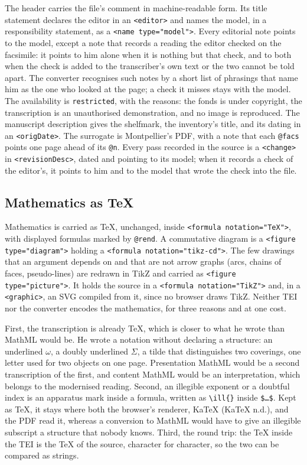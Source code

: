 \documentclass[11pt]{article}
\begin{document}
The header carries the file's comment in machine-readable form. Its title statement declares the editor in an \texttt{<editor>} and names the model, in a responsibility statement, as a \texttt{<name type="model">}. Every editorial note points to the model, except a note that records a reading the editor checked on the facsimile: it points to him alone when it is nothing but that check, and to both when the check is added to the transcriber's own text or the two cannot be told apart. The converter recognises such notes by a short list of phrasings that name him as the one who looked at the page; a check it misses stays with the model. The availability is \texttt{restricted}, with the reasons: the fonds is under copyright, the transcription is an unauthorised demonstration, and no image is reproduced. The manuscript description gives the shelfmark, the inventory's title, and its dating in an \texttt{<origDate>}. The surrogate is Montpellier's PDF, with a note that each \texttt{@facs} points one page ahead of its \texttt{@n}. Every pass recorded in the source is a \texttt{<change>} in \texttt{<revisionDesc>}, dated and pointing to its model; when it records a check of the editor's, it points to him and to the model that wrote the check into the file.

\subsection{Mathematics as TeX}

Mathematics is carried as TeX, unchanged, inside \texttt{<formula notation="TeX">}, with displayed formulas marked by \texttt{@rend}. A commutative diagram is a \texttt{<figure type="diagram">} holding a \texttt{<formula notation="tikz-cd">}. The few drawings that an argument depends on and that are not arrow graphs (arcs, chains of faces, pseudo-lines) are redrawn in TikZ and carried as \texttt{<figure type="picture">}. It holds the source in a \texttt{<formula notation="TikZ">} and, in a \texttt{<graphic>}, an SVG compiled from it, since no browser draws TikZ. Neither TEI nor the converter encodes the mathematics, for three reasons and at one cost.

First, the transcription is already TeX, which is closer to what he wrote than MathML would be. He wrote a notation without declaring a structure: an underlined \(\omega\), a doubly underlined \(\Sigma\), a tilde that distinguishes two coverings, one letter used for two objects on one page. Presentation MathML would be a second transcription of the first, and content MathML would be an interpretation, which belongs to the modernised reading. Second, an illegible exponent or a doubtful index is an apparatus mark inside a formula, written as \texttt{\textbackslash ill\{\}} inside \texttt{\$…\$}. Kept as TeX, it stays where both the browser's renderer, KaTeX (KaTeX n.d.), and the PDF read it, whereas a conversion to MathML would have to give an illegible subscript a structure that nobody knows. Third, the round trip: the TeX inside the TEI is the TeX of the source, character for character, so the two can be compared as strings.
\end{document}
